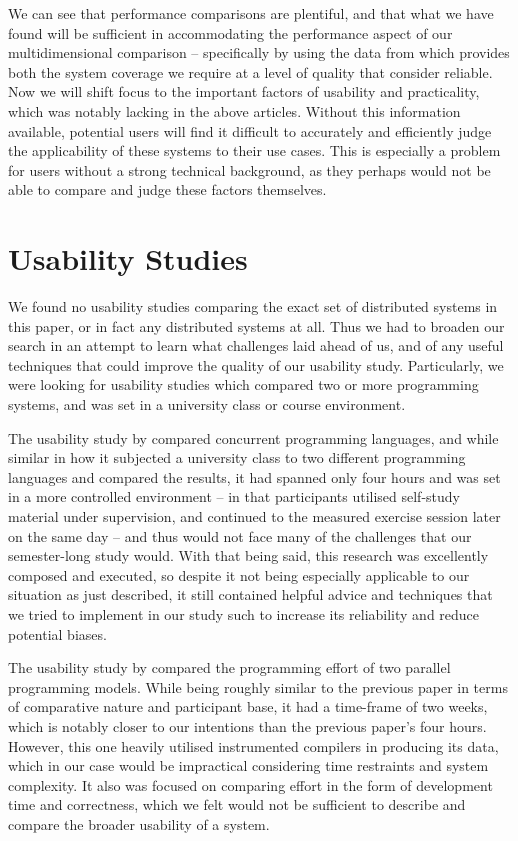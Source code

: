   We can see that performance comparisons are plentiful, and that what we have found will be sufficient in accommodating the performance aspect of our multidimensional comparison -- specifically by using the data from \citeauthor{VEIGA:EVALUATION:2015} \cite{VEIGA:EVALUATION:2015} which provides both the system coverage we require at a level of quality that consider reliable. Now we will shift focus to the important factors of usability and practicality, which was notably lacking in the above articles. Without this information available, potential users will find it difficult to accurately and efficiently judge the applicability of these systems to their use cases. This is especially a problem for users without a strong technical background, as they perhaps would not be able to compare and judge these factors themselves.


\section{Usability Studies}

  We found no usability studies comparing the exact set of distributed systems in this paper, or in fact any distributed systems at all. Thus we had to broaden our search in an attempt to learn what challenges laid ahead of us, and of any useful techniques that could improve the quality of our usability study. Particularly, we were looking for usability studies which compared two or more programming systems, and was set in a university class or course environment.
  
  The usability study by \citeauthor{NANZ:CONCURRENCY_STUDY:2013} \cite{NANZ:CONCURRENCY_STUDY:2013} compared concurrent programming languages, and while similar in how it subjected a university class to two different programming languages and compared the results, it had spanned only four hours and was set in a more controlled environment -- in that participants utilised self-study material under supervision, and continued to the measured exercise session later on the same day -- and thus would not face many of the challenges that our semester-long study would. With that being said, this research was excellently composed and executed, so despite it not being especially applicable to our situation as just described, it still contained helpful advice and techniques that we tried to implement in our study such to increase its reliability and reduce potential biases.
  
  The usability study by \citeauthor{HOCHSTEIN:CONCURRENCY_STUDY:2008} \cite{HOCHSTEIN:CONCURRENCY_STUDY:2008} compared the programming effort of two parallel programming models. While being roughly similar to the previous paper in terms of comparative nature and participant base, it had a time-frame of two weeks, which is notably closer to our intentions than the previous paper's four hours. However, this one heavily utilised instrumented compilers in producing its data, which in our case would be impractical considering time restraints and system complexity. It also was focused on comparing effort in the form of development time and correctness, which we felt would not be sufficient to describe and compare the broader usability of a system.
  

